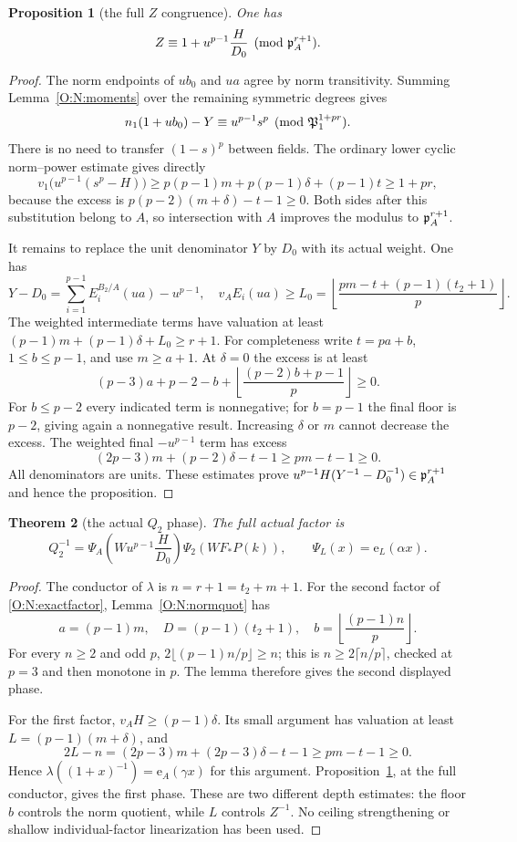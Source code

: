 \documentclass[11pt]{amsart}
\newtheorem{theorem}{Theorem}[section]
\newtheorem{proposition}[theorem]{Proposition}
\theoremstyle{definition}
\theoremstyle{remark}
\newcommand{\floor}[1]{\left\lfloor #1\right\rfloor}
\begin{document}
\begin{proposition}[the full $Z$ congruence]\label{O:N:Z}
One has
\[
 Z\equiv1+u^{p-1}\frac H{D_0}\pmod{\mathfrak p_A^{r+1}}.
\]
\end{proposition}
\begin{proof}
The norm endpoints of $ub_0$ and $ua$ agree by norm transitivity.
Summing Lemma~\ref{O:N:moments} over the remaining symmetric degrees gives
\[
 n_1(1+ub_0)-Y\equiv u^{p-1}s^p
             \pmod{\mathfrak P_1^{1+pr}}.
\]
There is no need to transfer $(1-s)^p$ between fields.
The ordinary lower cyclic norm--power estimate gives directly
\[
 v_1\bigl(u^{p-1}(s^p-H)\bigr)
 \ge p(p-1)m+p(p-1)\delta+(p-1)t\ge1+pr,
\]
because the excess is $p(p-2)(m+\delta)-t-1\ge0$.
Both sides after this substitution belong to $A$, so intersection with
$A$ improves the modulus to $\mathfrak p_A^{r+1}$.

It remains to replace the unit denominator $Y$ by $D_0$ with its
actual weight. One has
\[
 Y-D_0=\sum_{i=1}^{p-1}E_i^{B_2/A}(ua)-u^{p-1},
 \quad
 v_AE_i(ua)\ge L_0=
 \floor{\frac{pm-t+(p-1)(t_2+1)}p}.
\]
The weighted intermediate terms have valuation at least
$(p-1)m+(p-1)\delta+L_0\ge r+1$.
For completeness write $t=pa+b$, $1\le b\le p-1$, and use $m\ge a+1$.
At $\delta=0$ the excess is at least
\[
 (p-3)a+p-2-b+\floor{\frac{(p-2)b+p-1}{p}}\ge0.
\]
For $b\le p-2$ every indicated term is nonnegative; for $b=p-1$
the final floor is $p-2$, giving again a nonnegative result.
Increasing $\delta$ or $m$ cannot decrease the excess.
The weighted final $-u^{p-1}$ term has excess
\[
 (2p-3)m+(p-2)\delta-t-1\ge pm-t-1\ge0.
\]
All denominators are units. These estimates prove
$u^{p-1}H(Y^{-1}-D_0^{-1})\in\mathfrak p_A^{r+1}$ and hence the proposition.
\end{proof}

\begin{theorem}[the actual $Q_2$ phase]\label{O:N:Q2}
The full actual factor is
\[
 Q_2^{-1}=\Psi_A\!\left(Wu^{p-1}\frac{H}{D_0}\right)
          \Psi_2\!\left(WF_*P(k)\right),\qquad
 \Psi_L(x)=\mathrm e_L(\alpha x).
\]
\end{theorem}
\begin{proof}
The conductor of $\lambda$ is $n=r+1=t_2+m+1$.
For the second factor of \eqref{O:N:exactfactor}, Lemma~\ref{O:N:normquot}
has
\[
 a=(p-1)m,\quad D=(p-1)(t_2+1),\quad
 b=\floor{\frac{(p-1)n}{p}}.
\]
For every $n\ge2$ and odd $p$, $2\lfloor(p-1)n/p\rfloor\ge n$;
this is $n\ge2\lceil n/p\rceil$, checked at $p=3$ and then monotone
in $p$. The lemma therefore gives the second displayed phase.

For the first factor, $v_AH\ge(p-1)\delta$. Its small argument has
valuation at least $L=(p-1)(m+\delta)$, and
\[
 2L-n=(2p-3)m+(2p-3)\delta-t-1\ge pm-t-1\ge0.
\]
Hence $\lambda((1+x)^{-1})=\mathrm e_A(\gamma x)$ for this argument.
Proposition~\ref{O:N:Z}, at the full conductor, gives the first phase.
These are two different depth estimates: the floor $b$ controls the norm
quotient, while $L$ controls $Z^{-1}$. No ceiling strengthening or shallow
individual-factor linearization has been used.
\end{proof}
\end{document}
